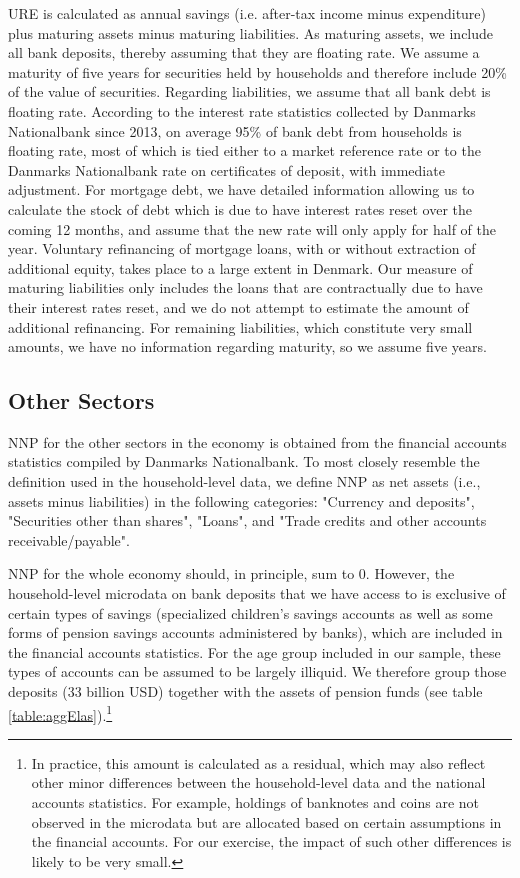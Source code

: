 \documentclass[titlepage]{\econtex}\newcommand{\texname}{ConsumptionHeterogeneity}
\begin{document}
	URE is calculated as annual savings (i.e. after-tax income minus expenditure) plus maturing assets minus maturing liabilities. As maturing assets, we include all bank deposits, thereby assuming that they are floating rate. We assume a maturity of five years for securities held by households and therefore include 20\% of the value of securities. Regarding liabilities, we assume that all bank debt is floating rate. According to the interest rate statistics collected by Danmarks Nationalbank since 2013, on average 95\% of bank debt from households is floating rate, most of which is tied either to a market reference rate or to the Danmarks Nationalbank rate on certificates of deposit, with immediate adjustment. For mortgage debt, we have detailed information allowing us to calculate the stock of debt which is due to have interest rates reset over the coming 12 months, and assume that the new rate will only apply for half of the year. Voluntary refinancing of mortgage loans, with or without extraction of additional equity, takes place to a large extent in Denmark. Our measure of maturing liabilities only includes the loans that are contractually due to have their interest rates reset, and we do not attempt to estimate the amount of additional refinancing. For remaining liabilities, which constitute very small amounts, we have no information regarding maturity, so we assume five years. 
	
	\subsection{Other Sectors}
	NNP for the other sectors in the economy is obtained from the financial accounts statistics compiled by Danmarks Nationalbank. To most closely resemble the definition used in the household-level data, we define NNP as net assets (i.e., assets minus liabilities) in the following categories: "Currency and deposits", "Securities other than shares", "Loans", and "Trade credits and other accounts receivable/payable". 
	
	NNP for the whole economy should, in principle, sum to 0. However, the household-level microdata on bank deposits that we have access to is exclusive of certain types of savings (specialized children's savings accounts as well as some forms of pension savings accounts administered by banks), which are included in the financial accounts statistics. For the age group included in our sample, these types of accounts can be assumed to be largely illiquid. We therefore group those deposits (33 billion USD) together with the assets of pension funds (see table \ref{table:aggElas}).\footnote{In practice, this amount is calculated as a residual, which may also reflect other minor differences between the household-level data and the national accounts statistics. For example, holdings of banknotes and coins are not observed in the microdata but are allocated based on certain assumptions in the financial accounts. For our exercise, the impact of such other differences is likely to be very small.}
	
\end{document}
